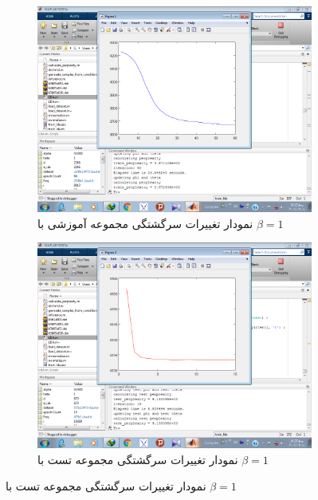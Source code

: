 \documentclass[11.5pt,a4paper]{article}
\begin{document}
\begin{figure}[h]
	\begin{subfigure}{.45\textwidth}
		\includegraphics[scale=0.25]{Imgs/k3_b1_a003_25s_ptr3672436.png}
		\caption{نمودار تغییرات سرگشتگی مجموعه‌ آموزشی با $\beta = 1$}
	\end{subfigure}
	\begin{subfigure}{.45\textwidth}
		\includegraphics[scale=0.25]{Imgs/k3_b1_a003_8s_pts4133398.png}
		\caption{نمودار تغییرات سرگشتگی مجموعه‌ تست با $\beta = 1$}
	\end{subfigure}


\end{figure}
\end{document}
